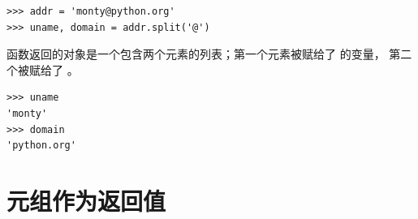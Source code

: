   

\begin{lstlisting}
>>> addr = 'monty@python.org'
>>> uname, domain = addr.split('@')
\end{lstlisting}

%

 函数返回的对象是一个包含两个元素的列表；第一个元素被赋给了 的变量， 第二个被赋给了 。

\begin{lstlisting}
>>> uname
'monty'
>>> domain
'python.org'
\end{lstlisting}
%

\section{元组作为返回值}
  


